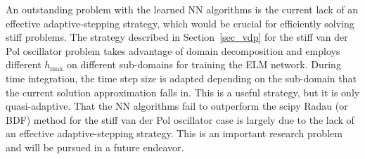 %


An outstanding problem with the learned NN algorithms is the current lack of an
effective adaptive-stepping strategy, which would be crucial for
efficiently solving stiff problems.
The strategy described in Section~\ref{sec_vdp} for
the stiff van der Pol oscillator problem takes advantage of
domain decomposition and employs different $h_{\max}$ on different sub-domains
for training the ELM  network. During time integration,
the time step size is adapted depending on the sub-domain that
the current solution approximation falls in. This is a useful strategy,
but it is only quasi-adaptive. That the NN algorithms fail to
outperform the scipy Radau (or BDF) method  for the stiff van der Pol
oscillator case is largely due to the lack of an effective adaptive-stepping
strategy. This is an important research problem and will be pursued
in a future endeavor.






